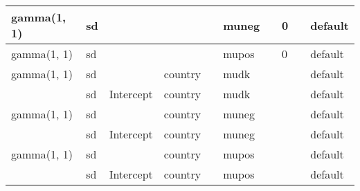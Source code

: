 \documentclass[
]{book}
\theoremstyle{definition}
\theoremstyle{definition}
\theoremstyle{definition}
\theoremstyle{definition}
\theoremstyle{remark}
\begin{document}
\begin{table}
\begin{tabular}[t]{l|l|l|l|l|l|l|l|l|l}
\hline
gamma(1, 1) & sd &  &  &  & muneg &  & 0 &  & default\\
\hline
gamma(1, 1) & sd &  &  &  & mupos &  & 0 &  & default\\
\hline
gamma(1, 1) & sd &  & country &  & mudk &  &  &  & default\\
\hline
 & sd & Intercept & country &  & mudk &  &  &  & default\\
\hline
gamma(1, 1) & sd &  & country &  & muneg &  &  &  & default\\
\hline
 & sd & Intercept & country &  & muneg &  &  &  & default\\
\hline
gamma(1, 1) & sd &  & country &  & mupos &  &  &  & default\\
\hline
 & sd & Intercept & country &  & mupos &  &  &  & default\\
\hline
\end{tabular}
\end{table}
\end{document}

